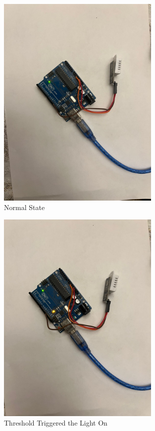 \documentclass[12pt]{article}
\begin{document}
\begin{itemize}
\begin{itemize}
\begin{minipage}[H]{0.45\textwidth}
\begin{figure}[H]
					\centering
					\includegraphics[width=0.7\textwidth]{ Images/Test/WhatsApp Image 2024-11-11 at 19.50.24_cb32c8b9.jpg}
					\caption{Normal State}
				\end{figure}
			\end{minipage}
			\hfill
			\begin{minipage}[H]{0.45\textwidth}
				\begin{figure}[H]
					\centering
					\includegraphics[width=0.7\textwidth]{Images/Test/WhatsApp Image 2024-11-11 at 19.50.24_5aa74f64.jpg}
					\caption{Threshold Triggered the Light On}
				\end{figure}
			\end{minipage}
		\end{itemize}
	\end{itemize}
	\newpage
\end{document}
